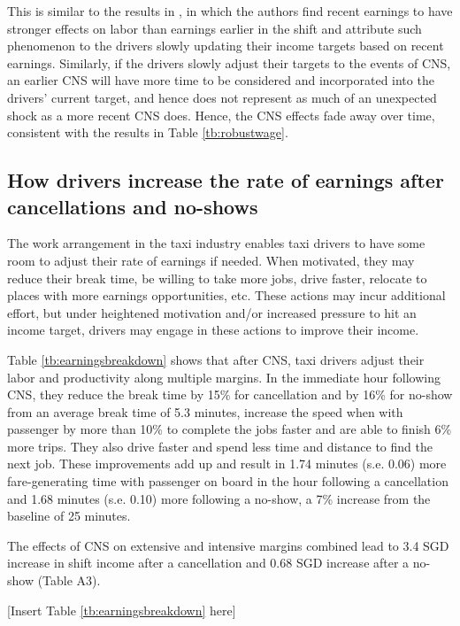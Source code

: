\documentclass[reviewmode,AEJ]{AEA}
\begin{document}
This is similar to the results in \citet{thakral2018daily}, in which the authors find recent
earnings to have stronger effects on labor than earnings earlier in the shift 
and attribute such phenomenon to the drivers slowly updating their income targets based on recent earnings.
Similarly, if the drivers slowly adjust their targets to the events of CNS, an earlier CNS will have
more time to be considered and incorporated into the drivers' current target, and hence does not represent
as much of an unexpected shock as a more recent CNS does. %
Hence, the CNS effects fade away over
time, consistent with the results in Table \ref{tb:robustwage}.


\subsection{How drivers increase the rate of earnings after cancellations and no-shows}
The work arrangement in the taxi industry enables taxi drivers to have some room to adjust their rate of earnings if needed. When motivated, they may reduce their break time, be willing to take more jobs, drive faster, relocate to places with more earnings opportunities, etc. These actions may incur additional effort, but under heightened motivation and/or increased pressure to hit an income target, drivers may engage 
in these actions to improve their income.

Table \ref{tb:earningsbreakdown} shows that after CNS, taxi drivers adjust their labor and productivity along multiple margins. In the immediate hour following CNS, they reduce the break time by 15\% %
for cancellation and by 16\% %
for no-show from an average break time of 5.3 minutes, increase the speed when with passenger by more than 10\% to complete the jobs faster %
and are able to finish 6\% more trips. They also drive faster and spend less time and distance to find the next job. These improvements add up and result in 1.74 minutes (s.e. 0.06) more fare-generating time with passenger on board in the hour following a cancellation and 1.68 minutes (s.e. 0.10) more following a no-show, a 7\% increase from the baseline of 25 minutes.  


The effects of CNS on extensive and intensive margins combined lead to 3.4 SGD increase in shift income after a cancellation and 0.68 SGD increase after a no-show (Table A3).

\begin{center}
	[Insert Table \ref{tb:earningsbreakdown} here]
\end{center}
\end{document}
